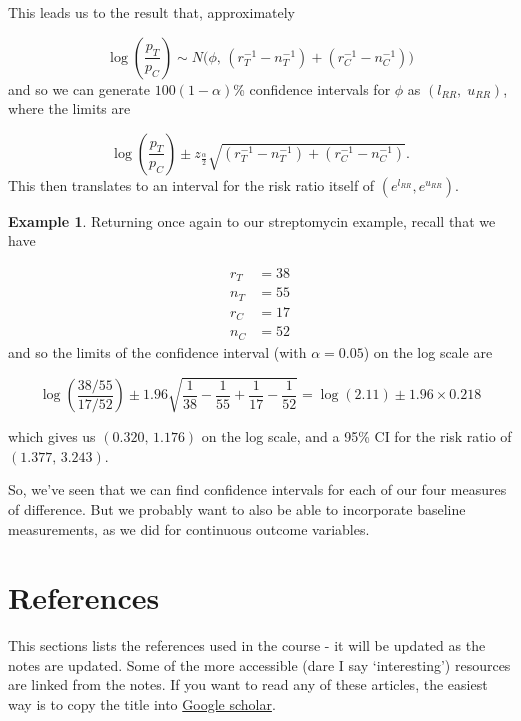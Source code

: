 \documentclass[
  openany]{book}
\theoremstyle{definition}
\theoremstyle{definition}
\newtheorem{example}{Example}[chapter]
\theoremstyle{definition}
\theoremstyle{definition}
\theoremstyle{remark}
\begin{document}
This leads us to the result that, approximately

\[\log\left(\frac{p_T}{p_C}\right) \sim N\bigg(\phi,\,\left(r_T^{-1} - n_T^{-1}\right) + \left(r_C^{-1} - n_C^{-1}\right) \bigg) \] and so we can generate \(100\left(1-\alpha\right)\)\% confidence intervals for \(\phi\) as \(\left(l_{RR},\;u_{RR}\right)\), where the limits are

\[
\log\left(\frac{p_T}{p_C}\right) \pm z_{\frac{\alpha}{2}}\sqrt{\left(r_T^{-1} - n_T^{-1}\right) + \left(r_C^{-1} - n_C^{-1}\right)}.
\]
This then translates to an interval for the risk ratio itself of \(\left(e^{l_{RR}},e^{u_{RR}}\right)\).

\begin{example}
Returning once again to our streptomycin example, recall that we have

\[
\begin{aligned}
r_T & = 38\\
n_T & = 55 \\
r_C & = 17 \\
n_C & = 52
\end{aligned}
\]
and so the limits of the confidence interval (with \(\alpha=0.05\)) on the log scale are

\[\log\left(\frac{38/55}{17/52}\right) \pm 1.96\sqrt{\frac{1}{38} - \frac{1}{55} + \frac{1}{17} - \frac{1}{52}} = \log(2.11) \pm 1.96 \times 0.218\]

which gives us \(\left(0.320,\,1.176\right)\) on the log scale, and a 95\% CI for the risk ratio of \(\left(1.377,\,3.243\right)\).
\end{example}

So, we've seen that we can find confidence intervals for each of our four measures of difference. But we probably want to also be able to incorporate baseline measurements, as we
did for continuous outcome variables.

\hypertarget{references}{%
\chapter*{References}\label{references}}

This sections lists the references used in the course - it will be updated as the notes are updated. Some of the more accessible (dare I say `interesting') resources are linked from the notes. If you want to read any of these articles, the easiest way is to copy the title into \href{https://scholar.google.co.uk/}{Google scholar}.

  
\end{document}
